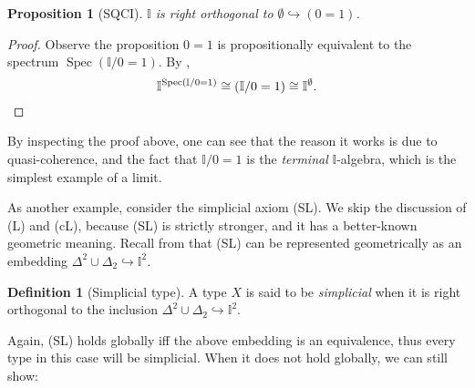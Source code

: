 \documentclass[a4paper,12pt]{amsart}
\newtheorem{proposition}[theorem]{Proposition}
\theoremstyle{definition}
\newtheorem{definition}[theorem]{Definition}
\newcommand{\mbb}[1]{\mathbb{#1}}
\newcommand{\I}{\mbb I}
\newcommand{\hook}{\hookrightarrow}
\newcommand{\emp}{\emptyset}
\newcommand{\spec}{\operatorname{Spec}}
\begin{document}
\begin{proposition}[SQCI]\label{specisnontrivial}
  $\I$ is right orthogonal to $\emp \hook (0 = 1)$.
\end{proposition}
\begin{proof}
  Observe the proposition $0 = 1$ is propositionally equivalent to the spectrum $\spec(\I/0=1)$. By ,
  \[ \I^{\spec(\I/0=1)} \cong (\I/0=1) \cong \I^\emp. \qedhere \]
\end{proof}

By inspecting the proof above, one can see that the reason it works is due to quasi-coherence, and the fact that $\I/0=1$ is the \emph{terminal} $\I$-algebra, which is the simplest example of a limit.

As another example, consider the simplicial axiom (SL). We skip the discussion of (L) and (cL), because (SL) is strictly stronger, and it has a better-known geometric meaning. Recall from  that (SL) can be represented geometrically as an embedding $\Delta^2\cup\Delta_2 \hook \I^2$.

\begin{definition}[Simplicial type]
  A type $X$ is said to be \emph{simplicial} when it is right orthogonal to the inclusion $\Delta^2 \cup \Delta_2 \hook \I^2$.
\end{definition}

Again, (SL) holds globally iff the above embedding is an equivalence, thus every type in this case will be simplicial. When it does not hold globally, we can still show:
\end{document}
